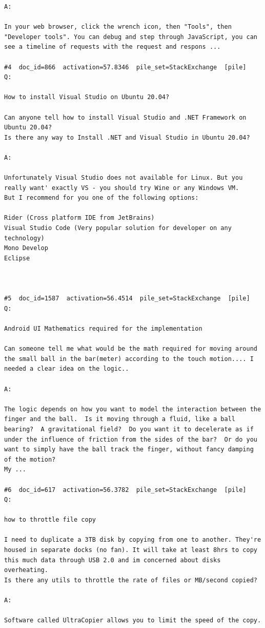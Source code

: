 \begin{verbatim}
A:

In your web browser, click the wrench icon, then "Tools", then "Developer tools". You can debug and step through JavaScript, you can see a timeline of requests with the request and respons ...

#4  doc_id=866  activation=57.8346  pile_set=StackExchange  [pile]
Q:

How to install Visual Studio on Ubuntu 20.04?

Can anyone tell how to install Visual Studio and .NET Framework on Ubuntu 20.04?
Is there any way to Install .NET and Visual Studio in Ubuntu 20.04?

A:

Unfortunately Visual Studio does not available for Linux. But you really want' exactly VS - you should try Wine or any Windows VM.
But I recommend for you one of the following options:

Rider (Cross platform IDE from JetBrains)
Visual Studio Code (Very popular solution for developer on any technology)
Mono Develop
Eclipse



#5  doc_id=1587  activation=56.4514  pile_set=StackExchange  [pile]
Q:

Android UI Mathematics required for the implementation

Can someone tell me what would be the math required for moving around the small ball in the bar(meter) according to the touch motion.... I needed a clear idea on the logic..

A:

The logic depends on how you want to model the interaction between the finger and the ball.  Is it moving through a fluid, like a ball bearing?  A gravitational field?  Do you want it to decelerate as if under the influence of friction from the sides of the bar?  Or do you want to simply have the ball track the finger, without fancy damping of the motion?
My ...

#6  doc_id=617  activation=56.3782  pile_set=StackExchange  [pile]
Q:

how to throttle file copy

I need to duplicate a 3TB disk by copying from one to another. They're housed in separate docks (no fan). It will take at least 8hrs to copy this much data through USB 2.0 and im concerned about disks overheating. 
Is there any utils to throttle the rate of files or MB/second copied?

A:

Software called UltraCopier allows you to limit the speed of the copy.




\end{verbatim}
